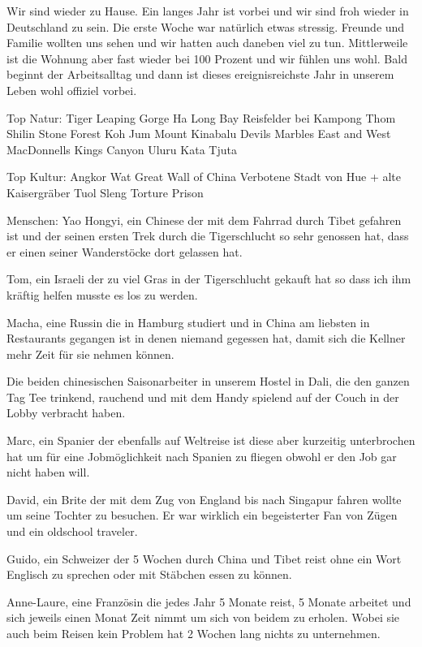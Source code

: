 \documentclass[11pt]{book}
\begin{document}
Wir sind wieder zu Hause. Ein langes Jahr ist vorbei und wir sind froh wieder in Deutschland zu sein. Die erste Woche war natürlich etwas stressig. Freunde 
und Familie wollten uns sehen und wir hatten auch daneben viel zu tun. Mittlerweile ist die Wohnung aber fast wieder bei 100 Prozent und wir fühlen uns wohl. 
Bald beginnt der Arbeitsalltag und dann ist dieses ereignisreichste Jahr in unserem Leben wohl offiziel vorbei. 




Top Natur:
Tiger Leaping Gorge
Ha Long Bay
Reisfelder bei Kampong Thom
Shilin Stone Forest
Koh Jum
Mount Kinabalu
Devils Marbles
East and West MacDonnells
Kings Canyon
Uluru
Kata Tjuta


Top Kultur:
Angkor Wat
Great Wall of China
Verbotene Stadt von Hue + alte Kaisergräber 
Tuol Sleng Torture Prison

Menschen:
Yao Hongyi, ein Chinese der mit dem Fahrrad durch Tibet gefahren ist und der seinen ersten Trek durch die Tigerschlucht so sehr 
genossen hat, dass er einen seiner Wanderstöcke dort gelassen hat.

Tom, ein Israeli der zu viel Gras in der Tigerschlucht gekauft hat so dass ich ihm kräftig helfen musste es los zu werden.

Macha, eine Russin die in Hamburg studiert und in China am liebsten in Restaurants gegangen ist in denen niemand gegessen hat, damit sich 
die Kellner mehr Zeit für sie nehmen können.

Die beiden chinesischen Saisonarbeiter in unserem Hostel in Dali, die den ganzen Tag Tee trinkend, rauchend und mit dem Handy spielend 
auf der Couch in der Lobby verbracht haben.

Marc, ein Spanier der ebenfalls auf Weltreise ist diese aber kurzeitig unterbrochen hat um für eine Jobmöglichkeit nach Spanien zu fliegen 
obwohl er den Job gar nicht haben will.

David, ein Brite der mit dem Zug von England bis nach Singapur fahren wollte um seine Tochter zu besuchen. Er war wirklich ein begeisterter
Fan von Zügen und ein oldschool traveler.

Guido, ein Schweizer der 5 Wochen durch China und Tibet reist ohne ein Wort Englisch zu sprechen oder mit Stäbchen essen zu können.

Anne-Laure, eine Französin die jedes Jahr 5 Monate reist, 5 Monate arbeitet und sich jeweils einen Monat Zeit nimmt um sich von beidem 
zu erholen. Wobei sie auch beim Reisen kein Problem hat 2 Wochen lang nichts zu unternehmen.
\end{document}
